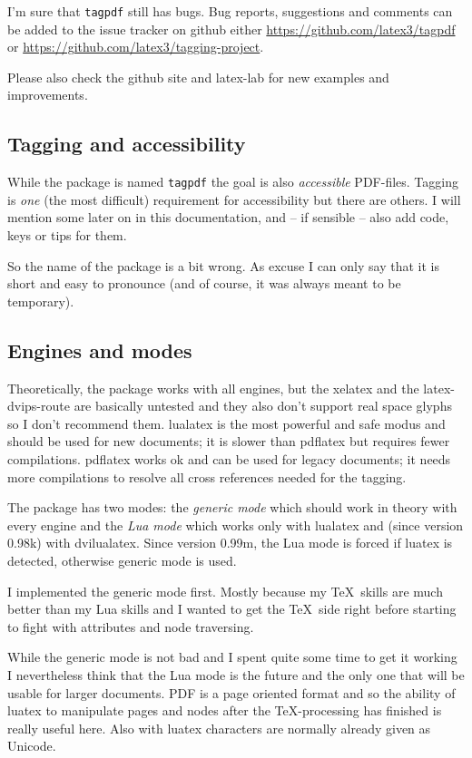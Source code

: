 \documentclass[bibliography=totoc,a4paper]{article}
\newcommand\pkg[1]{\texttt{#1}}
\newcommand\PDF{PDF}
\begin{document}
I'm sure that \pkg{tagpdf} still has bugs. Bug reports, suggestions and comments 
can be added to the issue tracker on github either 
\url{https://github.com/latex3/tagpdf} or
\url{https://github.com/latex3/tagging-project}. 

Please also check the github site and latex-lab for new examples and improvements.

\subsection{Tagging and accessibility}

While the package is named \pkg{tagpdf} the goal is also \emph{accessible} 
\PDF{}-files. Tagging is \emph{one} (the most difficult) requirement for 
accessibility but there are others. I will mention some later on in this 
documentation, and -- if sensible -- also add code, keys or 
tips for them. 

So the name of the package is a bit wrong. As excuse I can only say that it 
is short and easy to pronounce (and of course, it was always meant to be temporary). 


\subsection{Engines and modes}

Theoretically, the package works with all engines, but the xelatex and the 
latex-dvips-route are basically untested and they also don't support real 
space glyphs so I don't recommend them. lualatex is the most powerful and 
safe modus and should be used for new documents; it is slower than pdflatex 
but requires fewer compilations. pdflatex works ok and can be used for legacy 
documents; it needs more compilations to resolve all cross references needed 
for the tagging. 

The package has two modes: the \emph{generic mode} which should work in 
theory with every engine and the \emph{Lua mode} which works only with 
lualatex and (since version 0.98k) with dvilualatex. Since version 0.99m, 
the Lua mode is forced if luatex is detected, otherwise generic mode is used. 

I implemented the generic mode first. Mostly because my \TeX\ skills are much 
better than my Lua skills and I wanted to get the \TeX\ side right before 
starting to fight with attributes and node traversing. 

While the generic mode is not bad and I spent quite some time to get it 
working I nevertheless think that the Lua mode is the future and the only one 
that will be usable for larger documents. \PDF{} is a page oriented format 
and so the ability of luatex to manipulate pages and nodes after the 
\TeX-processing has finished is really useful here. Also with luatex characters are 
normally already given as Unicode. 
\end{document}
